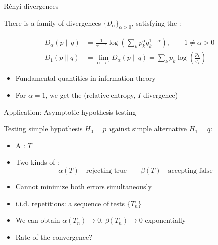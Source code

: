\documentclass[mathserif]{beamer}
\newcommand{\<}{\langle}
\renewcommand{\>}{\rangle}
\begin{document}
\begin{frame}{R\'enyi divergences}

There is a  family of divergences $\{D_\alpha\}_{\alpha>0}$,
satisfying the :

\begin{align*}
D_\alpha(p\|q)&=\frac1{\alpha-1}\log\left(\sum_k p_k^\alpha q_k^{1-\alpha}\right), \qquad 1\ne
\alpha>0\\
D_1(p\|q)&=\lim_{\alpha\to 1} D_\alpha(p\|q)=\sum_k p_k\log\left(\frac{p_k}{q_k}\right)
\end{align*}

\medskip


\begin{itemize}

\item Fundamental quantities in information theory

\item For $\alpha=1$, we get the   (relative entropy,
$I$-divergence)

\end{itemize}


\end{frame}


\begin{frame}{Application: Asymptotic hypothesis testing}

Testing simple hypothesis $H_0=p$ against simple alternative $H_1=q$:

\bigskip

\begin{itemize}
\item A : $T$
\vskip 3mm
\item Two kinds of :
\[
\alpha(T) \text{ - rejecting true} \qquad \beta(T)\text{ - accepting false}
\]
\item Cannot minimize both errors simultaneously
\vskip 3mm
\item i.i.d. repetitions: a sequence of tests $\{T_n\}$
\vskip 3mm
\item We can obtain $\alpha(T_n)\to 0$, $\beta(T_n)\to 0$ exponentially
\vskip 3mm
\item Rate of the convergence?
\end{itemize}




\end{frame}
\end{document}
